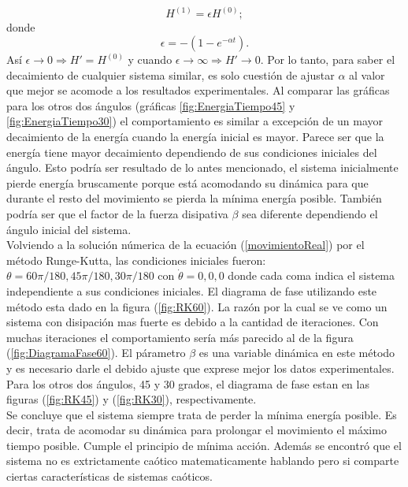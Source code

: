 \documentclass[aps,twocolumn,secnumarabic,nobalancelastpage,amsmath,amssymb,nofootinbib]{revtex4-1}
\begin{document}
			\begin{equation}
				H^{(1)} = \epsilon H^{(0)};
			\end{equation}  
		donde
			\begin{equation}
		 		\epsilon = -(1 - e^{-\alpha t}).
			\end{equation} 
		As\'i $\epsilon\rightarrow0\Rightarrow H' = H^{(0)}$ y cuando $\epsilon\rightarrow\infty\Rightarrow H'\rightarrow0$. Por lo tanto, para saber el decaimiento de cualquier sistema similar, es solo cuesti\'on de ajustar $\alpha$ al valor que mejor se acomode a los resultados experimentales. Al comparar las gr\'aficas para los otros dos \'angulos (gr\'aficas \ref{fig:EnergiaTiempo45} y \ref{fig:EnergiaTiempo30}) el comportamiento es similar a excepci\'on de un mayor decaimiento de la energ\'ia cuando la energ\'ia inicial es mayor. Parece ser que la energ\'ia tiene mayor decaimiento dependiendo de sus condiciones iniciales del \'angulo. Esto podr\'ia ser resultado de lo antes mencionado, el sistema inicialmente pierde energ\'ia bruscamente porque est\'a acomodando su din\'amica para que durante el resto del movimiento se pierda la m\'inima energ\'ia posible. Tambi\'en podr\'ia ser que el factor de la fuerza disipativa $\beta$ sea diferente dependiendo el \'angulo inicial del sistema.\\
		\indent Volviendo a la soluci\'on n\'umerica de la ecuaci\'on (\ref{movimientoReal}) por el m\'etodo Runge-Kutta, las condiciones iniciales fueron: $\theta = 60\pi/180, 45\pi/180, 30\pi/180$ con $\dot{\theta} = 0, 0, 0$ donde cada coma indica el sistema independiente a sus condiciones iniciales. El diagrama de fase utilizando este m\'etodo esta dado en la figura (\ref{fig:RK60}). La raz\'on por la cual se ve como un sistema con disipaci\'on mas fuerte es debido a la cantidad de iteraciones. Con muchas iteraciones el comportamiento ser\'ia m\'as parecido al de la figura (\ref{fig:DiagramaFase60}). El p\'arametro $\beta$ es una variable din\'amica en este m\'etodo y es necesario darle el debido ajuste que exprese mejor los datos experimentales. Para los otros dos \'angulos, 45 y 30 grados, el diagrama de fase estan en las figuras (\ref{fig:RK45}) y (\ref{fig:RK30}), respectivamente. \\ 
		Se concluye que el sistema siempre trata de perder la m\'inima energ\'ia posible. Es decir, trata de acomodar su din\'amica para prolongar el movimiento el m\'aximo tiempo posible. Cumple el principio de m\'inima acci\'on. Adem\'as se encontr\'o que el sistema no es extrictamente ca\'otico matematicamente hablando pero si comparte ciertas caracter\'isticas de sistemas ca\'oticos.           
		   
\end{document}
